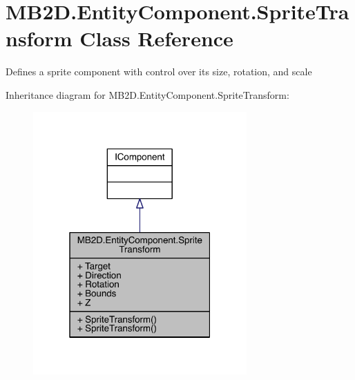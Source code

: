 \hypertarget{class_m_b2_d_1_1_entity_component_1_1_sprite_transform}{}\section{M\+B2\+D.\+Entity\+Component.\+Sprite\+Transform Class Reference}
\label{class_m_b2_d_1_1_entity_component_1_1_sprite_transform}


Defines a sprite component with control over its size, rotation, and scale  




Inheritance diagram for M\+B2\+D.\+Entity\+Component.\+Sprite\+Transform\+:\nopagebreak
\begin{figure}[H]
\begin{center}
\leavevmode
\includegraphics[width=232pt]{class_m_b2_d_1_1_entity_component_1_1_sprite_transform__inherit__graph}
\end{center}
\end{figure}


